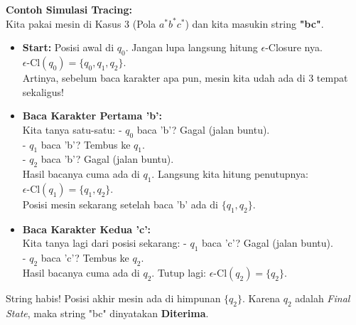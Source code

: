 \documentclass[12pt,a4paper]{article}
\begin{document}
\textbf{Contoh Simulasi Tracing:}\\
Kita pakai mesin di Kasus 3 (Pola $a^*b^*c^*$) dan kita masukin string \textbf{"bc"}.
\begin{itemize}
    \item \textbf{Start:} Posisi awal di $q_0$. Jangan lupa langsung hitung $\epsilon$-Closure nya.\\
    $\epsilon\text{-Cl}(q_0) = \{q_0, q_1, q_2\}$.\\
    Artinya, sebelum baca karakter apa pun, mesin kita udah ada di 3 tempat sekaligus!
    
    \item \textbf{Baca Karakter Pertama 'b':}\\
    Kita tanya satu-satu:
    - $q_0$ baca 'b'? Gagal (jalan buntu).\\
    - $q_1$ baca 'b'? Tembus ke $q_1$.\\
    - $q_2$ baca 'b'? Gagal (jalan buntu).\\
    Hasil bacanya cuma ada di $q_1$. Langsung kita hitung penutupnya: $\epsilon\text{-Cl}(q_1) = \{q_1, q_2\}$.\\
    Posisi mesin sekarang setelah baca 'b' ada di $\{q_1, q_2\}$.

    \item \textbf{Baca Karakter Kedua 'c':}\\
    Kita tanya lagi dari posisi sekarang:
    - $q_1$ baca 'c'? Gagal (jalan buntu).\\
    - $q_2$ baca 'c'? Tembus ke $q_2$.\\
    Hasil bacanya cuma ada di $q_2$. Tutup lagi: $\epsilon\text{-Cl}(q_2) = \{q_2\}$.
\end{itemize}

String habis! Posisi akhir mesin ada di himpunan $\{q_2\}$. Karena $q_2$ adalah \textit{Final State}, maka string "bc" dinyatakan \textbf{Diterima}.
\end{document}
